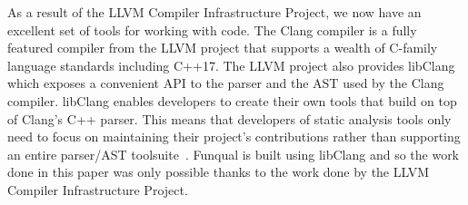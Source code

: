 As a result of the LLVM Compiler Infrastructure Project, we now have an excellent set of tools for working with code.  The Clang compiler is a fully featured compiler from the LLVM project that supports a wealth of C-family language standards including C++17.  The LLVM project also provides libClang which exposes a convenient API to the parser and the AST used by the Clang compiler.  libClang enables developers to create their own tools that build on top of Clang's C++ parser.  This means that developers of static analysis tools only need to focus on maintaining their project's contributions rather than supporting an entire parser/AST toolsuite~\cite{libclang-survey}.  Funqual is built using libClang and so the work done in this paper was only possible thanks to the work done by the LLVM Compiler Infrastructure Project.  
